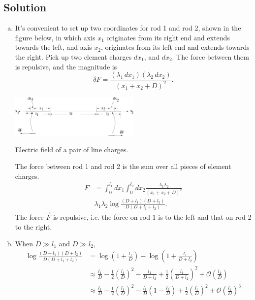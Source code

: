 \documentclass[solutions]{esg8022pset}
\begin{document}
\subsection{Solution}
  \begin{enumerate}[(a)]
    \item It's convenient to set up two coordinates for rod 1 and rod 2, shown in the figure below, in which axis $x_1$ originates from its right end and extends towards the left, and axis $x_2$, originates from its left end and extends towards the right.  Pick up two clement charges $dx_1$, and $dx_2$. The force between them is repulsive, and the magnitude is
    \begin{equation*}
      \delta F = \frac{(\lambda_1\,dx_1)(\lambda_2\,dx_2)}{(x_1 + x_2 + D)^2}.
    \end{equation*}
    \begin{center}\includegraphics[width=0.5\textwidth]{ps01_sol_08}\end{center}
    \begin{center}Electric field of a pair of line charges.\end{center}
    The force between rod 1 and rod 2 is the sum over all pieces of element charges.
    \begin{align*}
      F & = \int_0^{l_1}dx_1\int_0^{l_2}dx_2\frac{\lambda_1\lambda_2}{(x_1 + x_2 + D)^2} \\
        & \lambda_1 \lambda_2 \log\frac{(D + l_1)(D + l_2)}{D(D + l_1 + l_2)}.
    \end{align*}
    The force $\vec F$ is repulsive, i.e. the force on rod 1 is to the left and that on rod 2 to the right.
  \item When $D \gg l_1$ and $D \gg l_2$,
    \begin{align*}
      \log\frac{(D + l_1)(D + l_2)}{D(D + l_1 + l_2)} & = \log(1 + \frac{l_1}{D}) - \log(1 + \frac{l_1}{D + l_2}) \\
        & \approx \frac{l_1}{D} - \frac12 \left(\frac{l_1}{D}\right)^2 - \frac{l_1}{D + l_2} + \frac12 \left(\frac{l_1}{D + l_2}\right)^2 + \mathcal O\left(\frac{l_1}{D}\right) \\
        & \approx \frac{l_1}{D} - \frac12\left(\frac{l_1}{D}\right)^2 - \frac{l_1}{D}(1 - \frac{l_2}{D}) + \frac12 \left(\frac{l_1}{D}\right)^2 + \mathcal O\left(\frac{l_1}{D}\right)^3 \\

\end{align*}
\end{enumerate}
\end{document}
